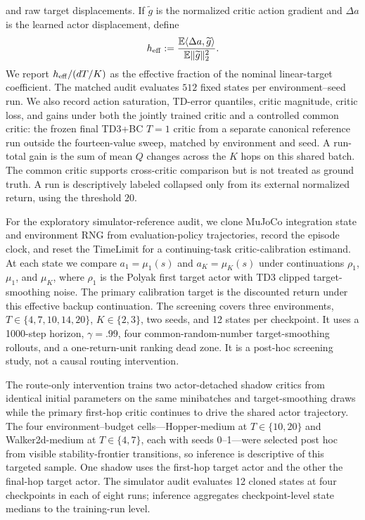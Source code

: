\documentclass[twoside]{article}
\begin{document}
and raw target displacements. If $\widetilde g$ is the normalized critic action
gradient and $\Delta a$ is the learned actor displacement, define
\[
h_{\rm eff}:=
\frac{\mathbb E\langle\Delta a,\widetilde g\rangle}
{\mathbb E\|\widetilde g\|_2^2}.
\]
We report $h_{\rm eff}/(dT/K)$ as the effective fraction of the nominal
linear-target coefficient. The matched audit evaluates $512$ fixed states per environment--seed run. We also record action saturation, TD-error quantiles, critic magnitude, critic loss, and gains under both the jointly trained critic and a controlled common critic: the frozen final TD3+BC $T=1$ critic from a separate canonical reference run outside the fourteen-value sweep, matched by environment and seed. A run-total gain is the sum of mean $Q$ changes across the $K$ hops on this shared batch. The common critic supports cross-critic comparison but is not treated as ground truth. A run is descriptively labeled collapsed only from its external normalized return, using the threshold $20$.

For the exploratory simulator-reference audit, we clone MuJoCo integration
state and environment RNG from evaluation-policy trajectories, record the
episode clock, and reset the TimeLimit for a continuing-task critic-calibration
estimand. At each state we compare $a_1=\mu_1(s)$ and
$a_K=\mu_K(s)$ under continuations $\rho_1$, $\mu_1$, and $\mu_K$, where
$\rho_1$ is the Polyak first target actor with TD3 clipped target-smoothing
noise. The primary calibration target is the discounted return under this
effective backup continuation. The screening covers three environments,
$T\in\{4,7,10,14,20\}$, $K\in\{2,3\}$, two seeds, and 12 states per
checkpoint. It uses a 1000-step horizon, $\gamma=.99$, four common-random-number
target-smoothing rollouts, and a one-return-unit ranking dead zone. It is a
post-hoc screening study, not a causal routing intervention.

The route-only intervention trains two actor-detached shadow critics from identical initial parameters on the same minibatches and target-smoothing draws while the primary first-hop critic continues to drive the shared actor trajectory. The four environment--budget cells---Hopper-medium at $T\in\{10,20\}$ and Walker2d-medium at $T\in\{4,7\}$, each with seeds 0--1---were selected post hoc from visible stability-frontier transitions, so inference is descriptive of this targeted sample. One shadow uses the first-hop target actor and the other the final-hop target actor. The simulator audit evaluates 12 cloned states at four checkpoints in each of eight runs; inference aggregates checkpoint-level state medians to the training-run level.
\end{document}
